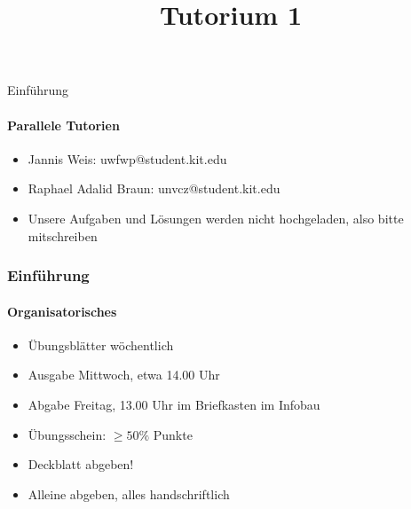 \documentclass[18pt]{beamer}
\title[Tutorium GBI]{Tutorium 1}
\begin{document}

\begin{frame}
 \titlepage
\end{frame}

\begin{frame}{Einführung}
 \framesubtitle{Parallele Tutorien}
 \begin{itemize}
  \item[]Jannis Weis: uwfwp@student.kit.edu
  \item[]Raphael Adalid Braun: unvcz@student.kit.edu
  \item[]Unsere Aufgaben und Lösungen werden nicht hochgeladen, also bitte mitschreiben
 \end{itemize}
\end{frame}
\begin{frame}
 \frametitle{Einführung}
 \framesubtitle{Organisatorisches}
 \begin{itemize}
  \item Übungsblätter wöchentlich
  \item Ausgabe Mittwoch, etwa 14.00 Uhr
  \item Abgabe Freitag, 13.00 Uhr im Briefkasten im Infobau
  \item Übungsschein: $\geq50\%$ Punkte
  \item Deckblatt abgeben!
  \item Alleine abgeben, alles handschriftlich
 \end{itemize}
\end{frame}
\end{document}
